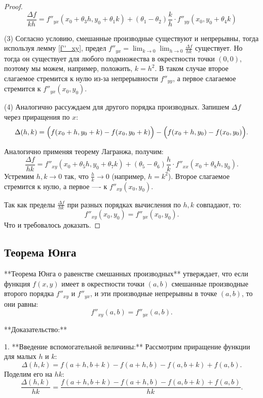\begin{proof}
\[
 \frac{\Delta f}{kh} =  f''_{yx}(x_0 + \theta_3 h, y_0 + \theta_1 k) + (\theta_1 - \theta_2)\frac{k}{h} \cdot f''_{yy}(x_0, y_0 + \theta_4 k)
\]


(3) Согласно условию, смешанные производные существуют и непрерывны, тогда используя лемму \ref{f''_xy}, предел $f''_{yx} = \lim_{k \to 0} \lim_{h \to 0} \frac{\Delta f}{hk}$ существует. Но тогда он существует для любого подмножества в окрестности точки $(0,0)$, поэтому мы можем, например, положить, $k = h^2$. В таком случае второе слагаемое стремится к нулю из-за непрерывности \(f''_{yy}\), а первое слагаемое стремится к \(f''_{yx}(x_0, y_0)\).

(4) Аналогично рассуждаем для другого порядка производных. Запишем \(\Delta f\) через приращения по \(x\):  
\[
\Delta(h, k) = \Bigl(f(x_0+h, y_0+k) - f(x_0, y_0+k)\Bigr) - \Bigl(f(x_0+h, y_0) - f(x_0, y_0)\Bigr).
\]  

Аналогично применяя теорему Лагранжа, получим:  
\[
\frac{\Delta f}{hk} = f''_{xy}(x_0 + \theta_5 h, y_0 + \theta_7 k) + (\theta_5 - \theta_6)\frac{h}{k} \cdot f''_{xx}(x_0 + \theta_8 h, y_0).
\]  
Устремим \(h, k \to 0\) так, что \(\frac{h}{k} \to 0\) (например, \(h = k^2\)). Второе слагаемое стремится к нулю, а первое —- к \(f''_{xy}(x_0, y_0)\).

Так как пределы \(\frac{\Delta f}{hk}\) при разных порядках вычисления по $h,k$ совпадают, то:  
\[
f''_{xy}(x_0, y_0) = f''_{yx}(x_0, y_0).
\]
Что и требовалось доказать.
\end{proof}

\subsection{Теорема Юнга}


**Теорема Юнга о равенстве смешанных производных** утверждает, что если функция \( f(x, y) \) имеет в окрестности точки \( (a, b) \) смешанные производные второго порядка \( f''_{xy} \) и \( f''_{yx} \), и эти производные непрерывны в точке \( (a, b) \), то они равны:  
\[
f''_{xy}(a, b) = f''_{yx}(a, b).
\]

**Доказательство:**

1. **Введение вспомогательной величины:**  
   Рассмотрим приращение функции для малых \( h \) и \( k \):  
   \[
   \Delta(h, k) = f(a + h, b + k) - f(a + h, b) - f(a, b + k) + f(a, b).
   \]  
   Поделим его на \( hk \):  
   \[
   \frac{\Delta(h, k)}{hk} = \frac{f(a + h, b + k) - f(a + h, b) - f(a, b + k) + f(a, b)}{hk}.
   \]

